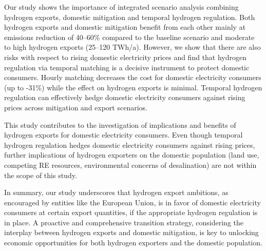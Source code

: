 



Our study shows the importance of integrated scenario analysis combining hydrogen exports, domestic mitigation and temporal hydrogen regulation.
Both hydrogen exports and domestic mitigation benefit from each other mainly at emissions reduction of 40--60\% compared to the baseline scenario and moderate to high hydrogen exports (25--120 TWh/a).
However, we show that there are also risks with respect to rising domestic electricity prices
and find that hydrogen regulation via temporal matching is a decisive instrument
to protect domestic consumers. Hourly matching decreases the cost for domestic electricity consumers (up to -31\%) while the effect on hydrogen exports is minimal. Temporal hydrogen regulation can effectively hedge domestic electricity consumers against rising prices across mitigation and export scenarios. %

This study contributes to the investigation of implications and benefits of hydrogen exports for domestic electricity consumers. Even though temporal hydrogen regulation hedges domestic electricity consumers against rising prices, further implications of hydrogen exporters on the domestic population (land use, competing RE resources, environmental concerns of desalination) are not within the scope of this study.

In summary, our study underscores that hydrogen export ambitions, as encouraged by entities like the European Union, is in favor of domestic electricity consumers at certain export quantities, if the appropriate hydrogen regulation is in place. A proactive and comprehensive transition strategy, considering the interplay between hydrogen exports and domestic mitigation, is key to unlocking economic opportunities for both hydrogen exporters and the domestic population. 



